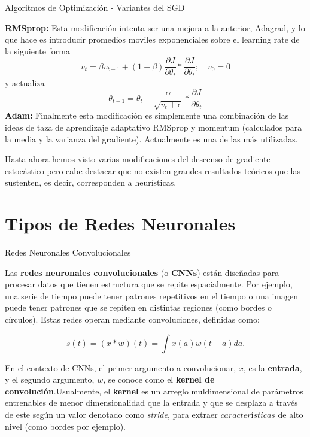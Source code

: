 \documentclass[handout, 9pt]{beamer}
\begin{document}
\begin{frame}{Algoritmos de Optimización - Variantes del SGD}

\textbf{RMSprop: } Esta modificación intenta ser una mejora a la anterior, Adagrad, y lo que hace es introducir promedios moviles exponenciales sobre el learning rate de la siguiente forma \pause
\[
v_t = \beta v_{t-1} + (1-\beta)\frac{\partial J}{\partial \theta_t} * \frac{\partial J}{\partial \theta_t} ; \quad v_0 = 0
\] \pause
y actualiza 
\[
\theta_{t+1} = \theta_t - \frac{\alpha}{\sqrt{v_t + \epsilon}} * \frac{\partial J}{\partial \theta_t}
\] \pause 
\textbf{Adam: } Finalmente esta modificación es simplemente una combinación de las ideas de taza de aprendizaje adaptativo RMSprop y momentum (calculados para la media y la varianza del gradiente). Actualmente es una de las más utilizadas. \pause

\vspace{0.2cm}

\begin{observacion}
Hasta ahora hemos visto varias modificaciones del descenso de gradiente estocástico pero cabe destacar que no existen grandes resultados teóricos que las sustenten, es decir, corresponden a heurísticas.
\end{observacion}

\end{frame}

\section{Tipos de Redes Neuronales}

\begin{frame}{Redes Neuronales Convolucionales}

Las \textbf{redes neuronales convolucionales} (o \textbf{CNNs}) están diseñadas para procesar datos que tienen estructura que se repite espacialmente. Por ejemplo, una serie de tiempo puede tener patrones repetitivos en el tiempo o una imagen puede tener patrones que se repiten en distintas regiones (como bordes o círculos). Estas redes operan mediante convoluciones, definidas como: \pause 

\begin{equation*}
s(t) = (x * w)(t) = \int x(a)w(t-a)da.
\end{equation*} \pause 

En el contexto de CNNs, el primer argumento a convolucionar, $x$, es la \textbf{entrada}, y el segundo argumento, $w$, se conoce como el \textbf{kernel de convolución}.\pause Usualmente, el \textbf{kernel} es un arreglo muldimensional de parámetros entrenables de menor dimensionalidad que la entrada y que se desplaza a través de este según un valor denotado como \textit{stride}, para extraer $\textit{características}$ de alto nivel (como bordes por ejemplo). 

\end{frame}
\end{document}
